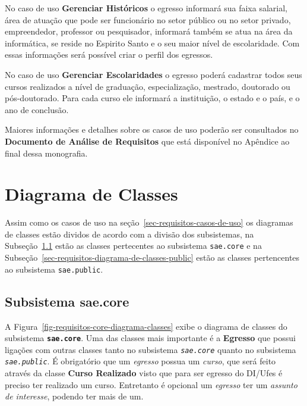 No caso de uso \textbf{Gerenciar Históricos} o egresso informará sua faixa salarial, área de atuação que pode ser funcionário no setor público ou no setor privado, empreendedor, professor ou pesquisador, informará também se atua na área da informática, se reside no Espirito Santo e o seu maior nível de escolaridade. Com essas informações será possível criar o perfil dos egressos.


No caso de uso \textbf{Gerenciar Escolaridades} o egresso poderá cadastrar todos seus cursos realizados a nível de graduação, especialização, mestrado, doutorado ou pós-doutorado. Para cada curso ele informará a instituição, o estado e o país, e o ano de conclusão.


Maiores informações e detalhes sobre os casos de uso poderão ser consultados no \textbf{Documento de Análise de Requisitos} que está disponível no Apêndice ao final dessa monografia.






\section{Diagrama de Classes}
\label{sec-requisitos-diagrama-de-classes}


Assim como os casos de uso na seção~\ref{sec-requisitos-casos-de-uso} os diagramas de classes estão dividos de acordo com a divisão dos subsistemas, na Subseção~\ref{sec-requisitos-diagrama-de-classes-core} estão as classes pertecentes ao subsistema \texttt{sae.core} e na Subseção~\ref{sec-requisitos-diagrama-de-classes-public} estão as classes pertencentes ao subsistema \texttt{sae.public}.



\subsection{Subsistema sae.core}
\label{sec-requisitos-diagrama-de-classes-core}

A Figura~\ref{fig-requisitos-core-diagrama-classes} exibe o diagrama de classes do subsistema \textbf{\texttt{sae.core}}. Uma das classes mais importante é a \textbf{Egresso} que possui ligações com outras classes tanto no subsistema \textit{\texttt{sae.core}} quanto no subsistema \textit{\texttt{sae.public}}. É obrigatório que um \emph{egresso} possua um \emph{curso}, que será feito através da classe \textbf{Curso Realizado} visto que para ser egresso do DI/Ufes é preciso ter realizado um curso. Entretanto é opcional um \emph{egresso} ter um \emph{assunto de interesse}, podendo ter mais de um.

